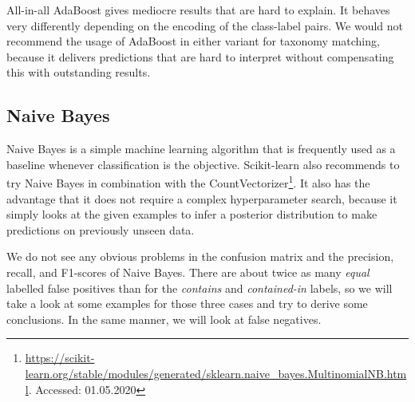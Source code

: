 All-in-all AdaBoost  gives mediocre results that are hard to explain.
It behaves very differently depending on the encoding of the class-label pairs.
We would not recommend the usage of AdaBoost in either variant for taxonomy matching, because it
delivers predictions that are hard to interpret without compensating this with outstanding results.

\subsection{Naive Bayes}

Naive Bayes is a simple machine learning algorithm that is frequently used as a baseline whenever classification is
the objective.
Scikit-learn also recommends to try Naive Bayes in combination with the
CountVectorizer\footnote{\url{https://scikit-learn.org/stable/modules/generated/sklearn.naive_bayes.MultinomialNB.html}. Accessed: 01.05.2020}.
It also has the advantage that it does not require a complex hyperparameter search, because it simply looks
at the given examples to infer a posterior distribution to make predictions on previously unseen data.

We do not see any obvious problems in the confusion matrix and the precision, recall, and F1-scores of Naive Bayes.
There are about twice as many \emph{equal} labelled false positives than for the \emph{contains} and \emph{contained-in} labels, so we will
take a look at some examples for those three cases and  try to derive some conclusions.
In the same manner, we will look at false negatives.

